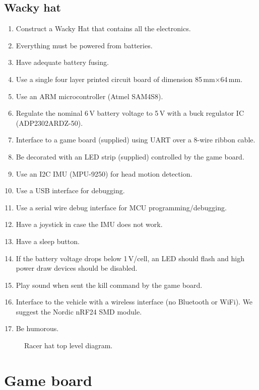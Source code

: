 \documentclass[11pt, a4paper]{article}
\begin{document}
\subsection{Wacky hat}


\begin{enumerate}
\item Construct a Wacky Hat that contains all the electronics.  
\item Everything must be powered from batteries.
\item Have adequate battery fusing.
\item Use a single four layer printed circuit board of dimension 85\,mm$\times$64\,mm.  
\item Use an ARM microcontroller (Atmel SAM4S8).
\item Regulate the nominal 6\,V battery voltage to 5\,V with a buck
  regulator IC (ADP2302ARDZ-50).
\item Interface to a game board (supplied) using UART over a 8-wire
  ribbon cable.
\item Be decorated with an LED strip (supplied) controlled by the game board.  
\item Use an I2C IMU (MPU-9250) for head motion detection.
\item Use a USB interface for debugging.
\item Use a serial wire debug interface for MCU programming/debugging.
\item Have a joystick in case the IMU does not work.
\item Have a sleep button.
\item If the battery voltage drops below 1\,V/cell, an LED should flash and high power draw devices should be disabled.
\item Play sound when sent the kill command by the game board.  
\item Interface to the vehicle with a wireless interface (no
  Bluetooth or WiFi).  We suggest the Nordic nRF24 SMD module.
\item Be humorous.  
\end{enumerate}

\vspace{1cm}

\begin{figure}[h]
  \centering
  
  \caption{Racer hat top level diagram.}
\end{figure}

\section{Game board}
\end{document}
